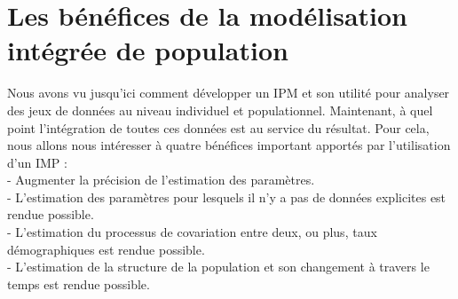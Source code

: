 \documentclass[12pt,a4paper]{article}
\begin{document}
\section{Les bénéfices de la modélisation intégrée de population}
Nous avons vu jusqu'ici comment développer un IPM et son utilité pour analyser des jeux de données au niveau individuel et populationnel. Maintenant, à quel point l'intégration de toutes ces données est au service du résultat. Pour cela, nous allons nous intéresser à quatre bénéfices important apportés par l'utilisation d'un IMP : \\
- Augmenter la précision de l'estimation des paramètres.\\
- L'estimation des paramètres pour lesquels il n'y a pas de données explicites est rendue possible.\\
- L'estimation du processus de covariation entre deux, ou plus, taux démographiques est rendue possible.\\
- L'estimation de la structure de la population et son changement à travers le temps est rendue possible.\vspace*{0,5cm}\\
\end{document}
